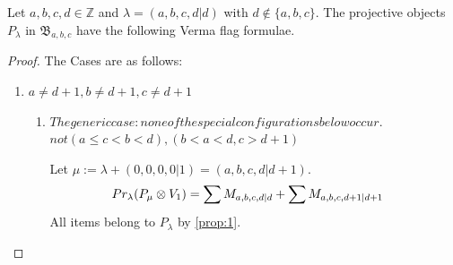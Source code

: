 
\begin{theorem} \label{thm:gl41-d}
  Let $a,b,c,d \in \mathbb{Z}$ and $\lambda = (a,b,c,d|d)$ with $d \notin \{a,b,c\}$. The projective objects $P_{\lambda}$ in $\mathfrak{B}_{a,b,c}$ have the following Verma flag formulae.
\end{theorem}
\begin{proof} The Cases are as follows:\par
\begin{enumerate}
  \item $a \neq d+1, b \neq d+1, c \neq d+1$
    \begin{enumerate}
      \item $The generic case: none of the special configurations below occur.$ $not(a \leq c < b < d),(b < a < d, c > d+1)$ \par
        Let $\mu:=\lambda + (0,0,0,0|1) = (a,b,c,d|d+1) $.
        \begin{equation}\notag
          \begin{aligned}
            Pr_{\lambda}(P_\mu \otimes V_{1}) &=
\sum M_{a,b,c,d|d}
+ \sum M_{a,b,c,d+1|d+1}
          \end{aligned}
        \end{equation}
All items belong to $P_\lambda$ by \cref{prop:1}.



\end{enumerate}
\end{enumerate}
\end{proof}

